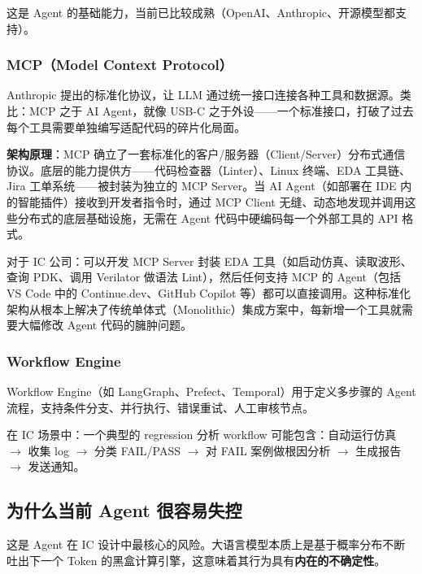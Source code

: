 \documentclass[UTF8,a4paper,10pt,oneside]{ctexart}
\begin{document}
这是 Agent 的基础能力，当前已比较成熟（OpenAI、Anthropic、开源模型都支持）。

\subsubsection{MCP（Model Context Protocol）}

Anthropic 提出的标准化协议，让 LLM 通过统一接口连接各种工具和数据源。类比：MCP 之于 AI Agent，就像 USB-C 之于外设——一个标准接口，打破了过去每个工具需要单独编写适配代码的碎片化局面。

\textbf{架构原理}：MCP 确立了一套标准化的客户/服务器（Client/Server）分布式通信协议。底层的能力提供方——代码检查器（Linter）、Linux 终端、EDA 工具链、Jira 工单系统——被封装为独立的 MCP Server。当 AI Agent（如部署在 IDE 内的智能插件）接收到开发者指令时，通过 MCP Client 无缝、动态地发现并调用这些分布式的底层基础设施，无需在 Agent 代码中硬编码每一个外部工具的 API 格式。

对于 IC 公司：可以开发 MCP Server 封装 EDA 工具（如启动仿真、读取波形、查询 PDK、调用 Verilator 做语法 Lint），然后任何支持 MCP 的 Agent（包括 VS Code 中的 Continue.dev、GitHub Copilot 等）都可以直接调用。这种标准化架构从根本上解决了传统单体式（Monolithic）集成方案中，每新增一个工具就需要大幅修改 Agent 代码的臃肿问题。

\subsubsection{Workflow Engine}

Workflow Engine（如 LangGraph、Prefect、Temporal）用于定义多步骤的 Agent 流程，支持条件分支、并行执行、错误重试、人工审核节点。

在 IC 场景中：一个典型的 regression 分析 workflow 可能包含：自动运行仿真 $\rightarrow$ 收集 log $\rightarrow$ 分类 FAIL/PASS $\rightarrow$ 对 FAIL 案例做根因分析 $\rightarrow$ 生成报告 $\rightarrow$ 发送通知。

\subsection{为什么当前 Agent 很容易失控}

这是 Agent 在 IC 设计中最核心的风险。大语言模型本质上是基于概率分布不断吐出下一个 Token 的黑盒计算引擎，这意味着其行为具有\textbf{内在的不确定性}。
\end{document}
